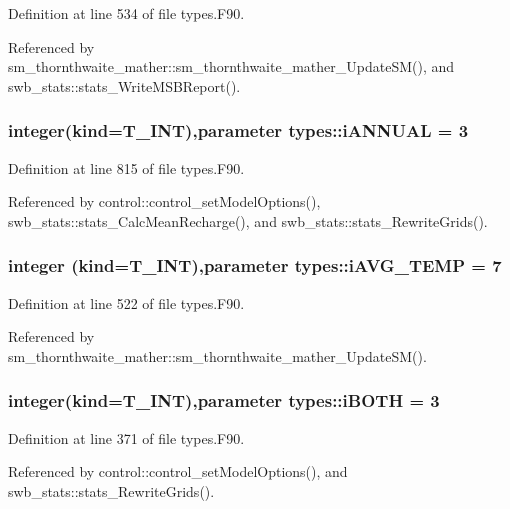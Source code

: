 Definition at line 534 of file types.F90.



Referenced by sm\_\-thornthwaite\_\-mather::sm\_\-thornthwaite\_\-mather\_\-UpdateSM(), and swb\_\-stats::stats\_\-WriteMSBReport().

\hypertarget{namespacetypes_a6b2dec75398d02bce486b6dd921e1807}{
\subsubsection[{iANNUAL}]{\setlength{\rightskip}{0pt plus 5cm}integer(kind={\bf T\_\-INT}),parameter {\bf types::iANNUAL} = 3}}
\label{namespacetypes_a6b2dec75398d02bce486b6dd921e1807}


Definition at line 815 of file types.F90.



Referenced by control::control\_\-setModelOptions(), swb\_\-stats::stats\_\-CalcMeanRecharge(), and swb\_\-stats::stats\_\-RewriteGrids().

\hypertarget{namespacetypes_a11c906ff2073a4fbe3cf9425dce415ae}{
\subsubsection[{iAVG\_\-TEMP}]{\setlength{\rightskip}{0pt plus 5cm}integer (kind={\bf T\_\-INT}),parameter {\bf types::iAVG\_\-TEMP} = 7}}
\label{namespacetypes_a11c906ff2073a4fbe3cf9425dce415ae}


Definition at line 522 of file types.F90.



Referenced by sm\_\-thornthwaite\_\-mather::sm\_\-thornthwaite\_\-mather\_\-UpdateSM().

\hypertarget{namespacetypes_acdb6a8e28292f829f0e39938283a434a}{
\subsubsection[{iBOTH}]{\setlength{\rightskip}{0pt plus 5cm}integer(kind={\bf T\_\-INT}),parameter {\bf types::iBOTH} = 3}}
\label{namespacetypes_acdb6a8e28292f829f0e39938283a434a}


Definition at line 371 of file types.F90.



Referenced by control::control\_\-setModelOptions(), and swb\_\-stats::stats\_\-RewriteGrids().

